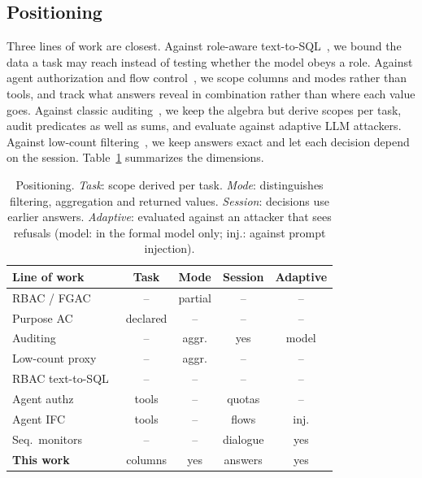 \documentclass[10pt,journal,compsoc]{IEEEtran}
\begin{document}
\subsection{Positioning}
Three lines of work are closest. Against role-aware text-to-SQL~\cite{jiang2026rbacsql}, we bound the data a task may reach instead of testing whether the model obeys a role. Against agent authorization and flow control~\cite{authz2026agents,agenra2026,debenedetti2026camel,shi2025progent,costa2025fides}, we scope columns and modes rather than tools, and track what answers reveal in combination rather than where each value goes. Against classic auditing~\cite{chin1982auditing,kenthapadi2005simulatable}, we keep the algebra but derive scopes per task, audit predicates as well as sums, and evaluate against adaptive LLM attackers. Against low-count filtering~\cite{francis2017diffix}, we keep answers exact and let each decision depend on the session. Table~\ref{tab:positioning} summarizes the dimensions.

\begin{table}[!t]
\caption{Positioning. \emph{Task}: scope derived per task. \emph{Mode}: distinguishes filtering, aggregation and returned values. \emph{Session}: decisions use earlier answers. \emph{Adaptive}: evaluated against an attacker that sees refusals (model: in the formal model only; inj.: against prompt injection).}
\label{tab:positioning}
\centering\scriptsize
\setlength{\tabcolsep}{2pt}
\begin{tabular}{@{}lcccc@{}}
\toprule
Line of work & Task & Mode & Session & Adaptive\\
\midrule
RBAC / FGAC~\cite{sandhu1996rbac,rizvi2004extending} & -- & partial & -- & --\\
Purpose AC~\cite{agrawal2002hippocratic,byun2008purpose} & declared & -- & -- & --\\
Auditing~\cite{chin1982auditing,kenthapadi2005simulatable} & -- & aggr. & yes & model\\
Low-count proxy~\cite{francis2017diffix} & -- & aggr. & -- & --\\
RBAC text-to-SQL~\cite{jiang2026rbacsql} & -- & -- & -- & --\\
Agent authz~\cite{authz2026agents,agenra2026} & tools & -- & quotas & --\\
Agent IFC~\cite{debenedetti2026camel,shi2025progent,costa2025fides} & tools & -- & flows & inj.\\
Seq.\ monitors~\cite{chen2025sequential} & -- & -- & dialogue & yes\\
\textbf{This work} & columns & yes & answers & yes\\
\bottomrule
\end{tabular}
\end{table}
\end{document}
